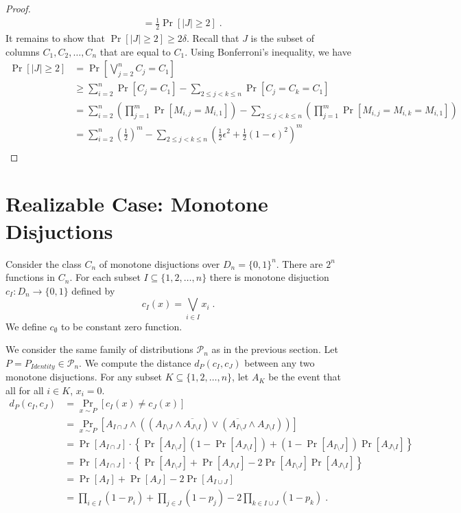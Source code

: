 \documentclass[12pt]{article}
\renewcommand{\P}{\mathcal{P}}
\begin{document}
\begin{proof}
\begin{align*}
& = \frac{1}{2} \Pr \left[ |J| \ge 2 \right] \; .
\end{align*}
It remains to show that $\Pr \left[ |J| \ge 2 \right] \ge 2 \delta$.
Recall that $J$ is the subset of columns $C_1, C_2, \dots, C_n$ that are equal to $C_1$.
Using Bonferroni's inequality, we have
\begin{align*}
\Pr\left[ |J| \ge 2 \right]
& = \Pr\left[ \bigvee_{j=2}^n C_j = C_1 \right] \\
& \ge \sum_{i=2}^n \Pr\left[ C_j = C_1 \right] - \sum_{2 \le  j < k \le n} \Pr\left[ C_j = C_k = C_1 \right] \\
& = \sum_{i=2}^n \left( \prod_{j=1}^m \Pr\left[ M_{i,j} = M_{i,1} \right] \right) - \sum_{2 \le j < k \le n} \left( \prod_{j=1}^m \Pr\left[ M_{i,j} = M_{i,k} = M_{i,1} \right] \right) \\
& = \sum_{i=2}^n \left( \frac{1}{2} \right)^m - \sum_{2 \le j < k \le n} \left( \frac{1}{2} \epsilon^2 + \frac{1}{2} (1-\epsilon)^2 \right)^m \\
\end{align*}
\end{proof}

\section{Realizable Case: Monotone Disjuctions}

Consider the class $C_n$ of monotone disjuctions over $D_n = \{0,1\}^n$.
There are $2^n$ functions in $C_n$. For each subset $I \subseteq \{1,2,\dots,n\}$
there is monotone disjuction $c_I:D_n \to \{0,1\}$ defined by
$$
c_I(x) = \bigvee_{i \in I} x_i \; .
$$
We define $c_\emptyset$ to be constant zero function.

We consider the same family of distributions $\P_n$ as in the previous section.
Let $P = P_{Identity} \in \P_n$. We compute the distance $d_P(c_I, c_J)$
between any two monotone disjuctions. For any subset
$K \subseteq \{1,2,\dots,n\}$, let $A_K$ be the event that all for all $i \in K$, $x_i = 0$.
\begin{align*}
d_P(c_I, c_J)
& = \Pr_{x \sim P}[c_I(x) \neq c_J(x)] \\
& = \Pr_{x \sim P}[A_{I \cap J} \wedge ((A_{I \setminus J} \wedge \overline{A_{J \setminus I}}) \vee (\overline{A_{I \setminus J}} \wedge A_{J \setminus I} )) ] \\
& = \Pr[A_{I \cap J}] \cdot \left\{ \Pr[A_{I \setminus J}] (1 - \Pr[A_{J \setminus I}]) + (1 - \Pr[A_{I \setminus J}]) \Pr[A_{J \setminus I}] \right\} \\
& = \Pr[A_{I \cap J}] \cdot \left\{ \Pr[A_{I \setminus J}] + \Pr[A_{J \setminus I}] - 2 \Pr[A_{I \setminus J}] \Pr[A_{J \setminus I}] \right\} \\
& = \Pr[A_I] + \Pr[A_J] - 2 \Pr[A_{I \cup J}] \\
& = \prod_{i \in I} (1 - p_i) + \prod_{j \in J} (1 - p_j) - 2 \prod_{k \in I \cup J} (1 - p_k) \; . \\
\end{align*}
\end{document}
